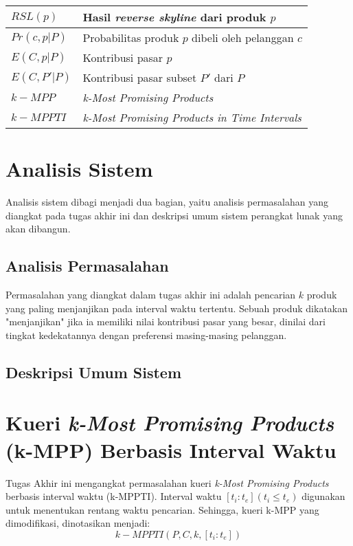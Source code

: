 \begin{longtable}{| p{3cm} | p{7cm} |}
	$RSL(p)$ & Hasil \textit{reverse skyline} dari produk $p$\\ \hline
	$Pr(c, p|P)$ & Probabilitas produk $p$ dibeli oleh pelanggan $c$ \\ \hline
	$E(C, p|P)$ & Kontribusi pasar $p$\\ \hline
	$E(C, P'|P)$ & Kontribusi pasar subset $P'$ dari $P$ \\ \hline
	$k-MPP$ & \textit{k-Most Promising Products} \\ \hline
	$k-MPPTI$ & \textit{k-Most Promising Products in Time Intervals} \\ \hline
\end{longtable}

\section{Analisis Sistem}
\tab Analisis sistem dibagi menjadi dua bagian, yaitu analisis permasalahan yang diangkat pada tugas akhir ini dan deskripsi umum sistem perangkat lunak yang akan dibangun.

\subsection{Analisis Permasalahan}
\tab Permasalahan yang diangkat dalam tugas akhir ini adalah pencarian $k$ produk yang paling menjanjikan pada interval waktu tertentu. Sebuah produk dikatakan "menjanjikan" jika ia memiliki nilai kontribusi pasar yang besar, dinilai dari tingkat kedekatannya dengan preferensi masing-masing pelanggan.

\subsection{Deskripsi Umum Sistem}
\tab 

\section{Kueri \textit{k-Most Promising Products} (k-MPP) Berbasis Interval Waktu}
\tab Tugas Akhir ini mengangkat permasalahan kueri \textit{k-Most Promising Products} berbasis interval waktu (k-MPPTI). Interval waktu $[t_i:t_e ](t_i \leq t_e)$ digunakan untuk menentukan rentang waktu pencarian. Sehingga, kueri k-MPP yang dimodifikasi, dinotasikan menjadi:
\begin{equation}\label{eq:kmppts}
k-MPPTI(P, C, k, [t_i:t_e])
\end{equation} 

